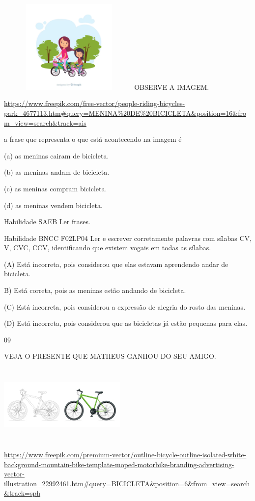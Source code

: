 {{{{{{\includegraphics[width=2.76266in,height=1.82051in]{media/image179.png}OBSERVE
A IMAGEM.

\url{https://www.freepik.com/free-vector/people-riding-bicycles-park_4677113.htm\#query=MENINA\%20DE\%20BICICLETA\&position=16\&from_view=search\&track=ais}

a frase que representa o que está acontecendo na imagem é

(a) as meninas cairam de bicicleta.

(b) as meninas andam de bicicleta.

(c) as meninas compram bicicleta.

(d) as meninas vendem bicicleta.

Habilidade SAEB Ler frases.

Habilidade BNCC F02LP04 Ler e escrever corretamente palavras com sílabas
CV, V, CVC, CCV, identificando que existem vogais em todas as sílabas.

(A) Está incorreta, pois considerou que elas estavam aprendendo andar de
bicicleta.

B) Está correta, pois as meninas estão andando de bicicleta.

(C) Está incorreta, pois considerou a expressão de alegria do rosto das
meninas.

(D) Está incorreta, pois considerou que as bicicletas já estão pequenas
para elas.

\num{09}

VEJA O PRESENTE QUE MATHEUS GANHOU DO SEU AMIGO.

\includegraphics[width=2.46250in,height=1.54444in]{media/image180.jpeg}

\url{https://www.freepik.com/premium-vector/outline-bicycle-outline-isolated-white-background-mountain-bike-template-moped-motorbike-branding-advertising-vector-illustration_22992461.htm\#query=BICICLETA\&position=6\&from_view=search\&track=sph}

}}}}}}
